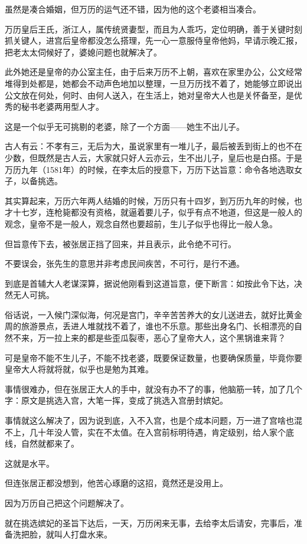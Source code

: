 \begin{multicols}{\theparacolNo}
虽然是凑合婚姻，但万历的运气还不错，因为他的这个老婆相当凑合。

万历皇后王氏，浙江人，属传统贤妻型，而且为人乖巧，定位明确，善于关键时刻抓关键人，进宫后皇帝都没怎么搭理，先一心一意服侍皇帝他妈，早请示晚汇报，把老太太伺候好了，婆媳问题也就解决了。

此外她还是皇帝的办公室主任，由于后来万历不上朝，喜欢在家里办公，公文经常堆得到处都是，她都会不动声色地加以整理，一旦万历找不着了，她能够立即说出公文放在何处，何时、由何人送入，在生活上，她对皇帝大人也是关怀备至，是优秀的秘书老婆两用型人才。

这是一个似乎无可挑剔的老婆，除了一个方面——她生不出儿子。

古人有云：不孝有三，无后为大，虽说家里有一堆儿子，最后被丢到街上的也不在少数，但既然是古人云，大家就只好人云亦云，生不出儿子，皇后也是白搭。于是万历九年（1581年）的时候，在李太后的授意下，万历下达旨意：命令各地选取女子，以备挑选。

其实算起来，万历六年两人结婚的时候，万历只有十四岁，到万历九年的时候，也才十七岁，连枪毙都没有资格，就逼着要儿子，似乎有点不地道，但这是一般人的观念，皇帝不是一般人，观念自然也要超前，生儿子似乎也得比一般人急。

但旨意传下去，被张居正挡了回来，并且表示，此令绝不可行。

不要误会，张先生的意思并非考虑民间疾苦，不可行，是行不通。

到底是首辅大人老谋深算，据说他刚看到这道旨意，便下断言：如按此令下达，决然无人可挑。

俗话说，一入候门深似海，何况是宫门，辛辛苦苦养大的女儿送进去，就好比黄金周的旅游景点，丢进人堆就找不着了，谁也不乐意。那些出身名门、长相漂亮的自然不来，万一拉上来的都是些歪瓜裂枣，恶心了皇帝大人，这个黑锅谁来背？

可是皇帝不能不生儿子，不能不找老婆，既要保证数量，也要确保质量，毕竟你要皇帝大人将就将就，似乎也是勉为其难。

事情很难办，但在张居正大人的手中，就没有办不了的事，他脑筋一转，加了几个字：原文是挑选入宫，大笔一挥，变成了挑选入宫册封嫔妃。

事情就这么解决了，因为说到底，入不入宫，也是个成本问题，万一进了宫啥也混不上，几十年没人管，实在不太值。在入宫前标明待遇，肯定级别，给人家个底线，自然就都来了。

这就是水平。

但连张居正都没想到，他苦心琢磨的这招，竟然还是没用上。

因为万历自己把这个问题解决了。

就在挑选嫔妃的圣旨下达后，一天，万历闲来无事，去给李太后请安，完事后，准备洗把脸，就叫人打盘水来。


\end{multicols}
